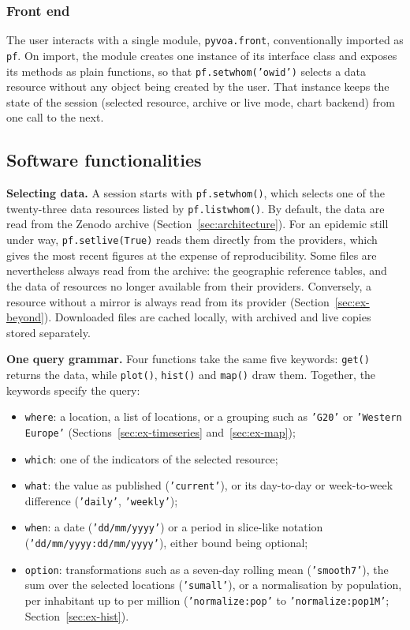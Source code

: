 \documentclass[preprint,12pt,a4paper]{elsarticle}
\begin{document}
\subsubsection{Front end}

The user interacts with a single module, \texttt{pyvoa.front}, conventionally
imported as \texttt{pf}. On import, the module creates one instance of its
interface class and exposes its methods as plain functions, so that
\texttt{pf.setwhom('owid')} selects a data resource without any object being
created by the user. That instance keeps the state of the session (selected
resource, archive or live mode, chart backend) from one call to the next.


\subsection{Software functionalities}
\label{sec:functionalities}

\textbf{Selecting data.} A session starts with \texttt{pf.setwhom()}, which
selects one of the twenty-three data resources listed by
\texttt{pf.listwhom()}. By default, the data are read from the Zenodo archive
(Section~\ref{sec:architecture}). For an epidemic still under way,
\texttt{pf.setlive(True)} reads them directly from the providers, which gives
the most recent figures at the expense of reproducibility. Some files are
nevertheless always read from the archive: the geographic reference tables,
and the data of resources no longer available from their providers.
Conversely, a resource without a mirror is always read from its provider
(Section~\ref{sec:ex-beyond}). Downloaded files are cached locally, with
archived and live copies stored separately.

\textbf{One query grammar.} Four functions take the same five keywords:
\texttt{get()} returns the data, while \texttt{plot()}, \texttt{hist()} and
\texttt{map()} draw them. Together, the keywords specify the query:
\begin{itemize}
\item \texttt{where}: a location, a list of locations, or a grouping such as
  \texttt{'G20'} or \texttt{'Western Europe'}
  (Sections~\ref{sec:ex-timeseries} and~\ref{sec:ex-map});
\item \texttt{which}: one of the indicators of the selected resource;
\item \texttt{what}: the value as published (\texttt{'current'}), or its
  day-to-day or week-to-week difference (\texttt{'daily'}, \texttt{'weekly'});
\item \texttt{when}: a date (\texttt{'dd/mm/yyyy'}) or a period in slice-like
  notation (\texttt{'dd/mm/yyyy:dd/mm/yyyy'}), either bound being optional;
\item \texttt{option}: transformations such as a seven-day rolling mean
  (\texttt{'smooth7'}), the sum over the selected locations
  (\texttt{'sumall'}), or a normalisation by population, per inhabitant up to
  per million (\texttt{'normalize:pop'} to \texttt{'normalize:pop1M'};
  Section~\ref{sec:ex-hist}).
\end{itemize}
\end{document}
